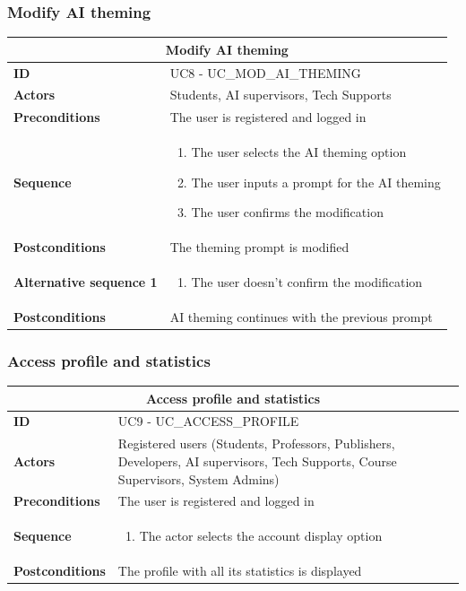 \subsubsection{Modify AI theming}
\begin{tabular}{|m{2.5cm}|m{8cm}|}
	\hline
	\multicolumn{2}{|c|}{Modify AI theming} \\
	\hline
	\textbf{ID} & UC8 - UC\_MOD\_AI\_THEMING \\
	\hline
	\textbf{Actors} & Students, AI supervisors, Tech Supports \\
	\hline
	\textbf{Preconditions} & The user is registered and logged in \\
	\hline
	\textbf{Sequence} & 
	\begin{enumerate}
		\item The user selects the AI theming option
		\item The user inputs a prompt for the AI theming
		\item The user confirms the modification
	\end{enumerate} \\
	\hline
	\textbf{Postconditions} & The theming prompt is modified \\
	\hline
	
	\textbf{Alternative sequence 1} & 
	\begin{enumerate}
		\item The user doesn’t confirm the modification
	\end{enumerate} \\
	\hline
	\textbf{Postconditions} & AI theming continues with the previous prompt \\
	\hline
\end{tabular}

\subsubsection{Access profile and statistics}
\begin{tabular}{|m{2.5cm}|m{8cm}|}
	\hline
	\multicolumn{2}{|c|}{Access profile and statistics} \\
	\hline
	\textbf{ID} & UC9 - UC\_ACCESS\_PROFILE \\
	\hline
	\textbf{Actors} & Registered users (Students, Professors, Publishers, Developers, AI supervisors, Tech Supports, Course Supervisors, System Admins) \\
	\hline
	\textbf{Preconditions} & The user is registered and logged in \\
	\hline
	\textbf{Sequence} & 
	\begin{enumerate}
		\item The actor selects the account display option
	\end{enumerate} \\
	\hline
	\textbf{Postconditions} & The profile with all its statistics is displayed \\
	\hline
\end{tabular}

